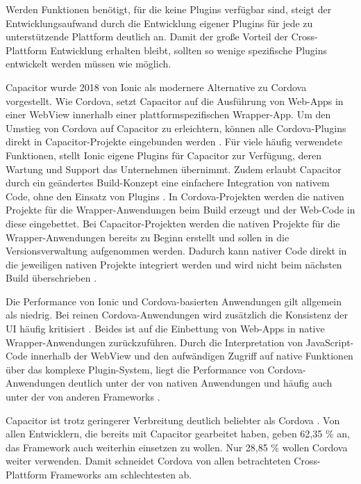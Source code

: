Werden Funktionen benötigt, für die keine Plugins verfügbar sind, steigt der Entwicklungsaufwand durch die Entwicklung eigener Plugins für jede zu unterstützende Plattform deutlich an.
Damit der große Vorteil der Cross-Plattform Entwicklung erhalten bleibt, sollten so wenige spezifische Plugins entwickelt werden müssen wie möglich.


Capacitor wurde 2018 von Ionic als modernere Alternative zu Cordova vorgestellt.
Wie Cordova, setzt Capacitor auf die Ausführung von Web-Apps in einer WebView innerhalb einer plattformspezifischen Wrapper-App.
Um den Umstieg von Cordova auf Capacitor zu erleichtern, können alle Cordova-Plugins direkt in Capacitor-Projekte eingebunden werden \cite{Liebel_Cordova_Capacitor}.
Für viele häufig verwendete Funktionen, stellt Ionic eigene Plugins für Capacitor zur Verfügung, deren Wartung und Support das Unternehmen übernimmt.
Zudem erlaubt Capacitor durch ein geändertes Build-Konzept eine einfachere Integration von nativem Code, ohne den Einsatz von Plugins \cite{Ionic_Cordova_vs_Capacitor}.
In Cordova-Projekten werden die nativen Projekte für die Wrapper-Anwendungen beim Build erzeugt und der Web-Code in diese eingebettet.
Bei Capacitor-Projekten werden die nativen Projekte für die Wrapper-Anwendungen bereits zu Beginn erstellt und sollen in die Versionsverwaltung aufgenommen werden.
Dadurch kann nativer Code direkt in die jeweiligen nativen Projekte integriert werden und wird nicht beim nächsten Build überschrieben \cite{Liebel_Cordova_Capacitor}.


Die Performance von Ionic und Cordova-basierten Anwendungen gilt allgemein als niedrig.
Bei reinen Cordova-Anwendungen wird zusätzlich die Konsistenz der \ac{UI} häufig kritisiert \cite{Steyer_Cordova}.
Beides ist auf die Einbettung von Web-Apps in native Wrapper-Anwendungen zurückzuführen.
Durch die Interpretation von JavaScript-Code innerhalb der WebView und den aufwändigen Zugriff auf native Funktionen über das komplexe Plugin-System, liegt die Performance von Cordova-Anwendungen deutlich unter der von nativen Anwendungen und häufig auch unter der von anderen Frameworks \cite{Rieger_CrossPlatform_EvaluationFramework,Biorn-Hansen_PerformanceOverhead_CrossPlatform}.


Capacitor ist trotz geringerer Verbreitung deutlich beliebter als Cordova \cite{Stackoverflow_2022,Appfigures_TopSDKs}.
Von allen Entwicklern, die bereits mit Capacitor gearbeitet haben, geben 62,35 \% an, das Framework auch weiterhin einsetzen zu wollen.
Nur 28,85 \% wollen Cordova weiter verwenden.
Damit schneidet Cordova von allen betrachteten Cross-Plattform Frameworks am schlechtesten ab.